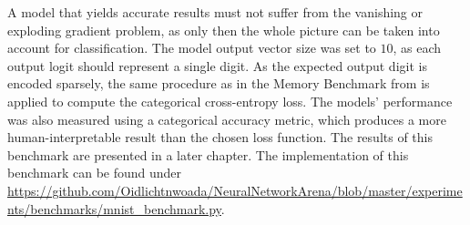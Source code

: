 \documentclass[draft,final]{vutinfth} %
\begin{document}
    A model that yields accurate results must not suffer from the vanishing or exploding gradient problem, as only then the whole picture can be taken into account for classification.
    The model output vector size was set to $10$, as each output logit should represent a single digit.
    As the expected output digit is encoded sparsely, the same procedure as in the Memory Benchmark from  is applied to compute the categorical cross-entropy loss.
    The models' performance was also measured using a categorical accuracy metric, which produces a more human-interpretable result than the chosen loss function.
    The results of this benchmark are presented in a later chapter.
    The implementation of this benchmark can be found under \url{https://github.com/Oidlichtnwoada/NeuralNetworkArena/blob/master/experiments/benchmarks/mnist_benchmark.py}.
\end{document}
